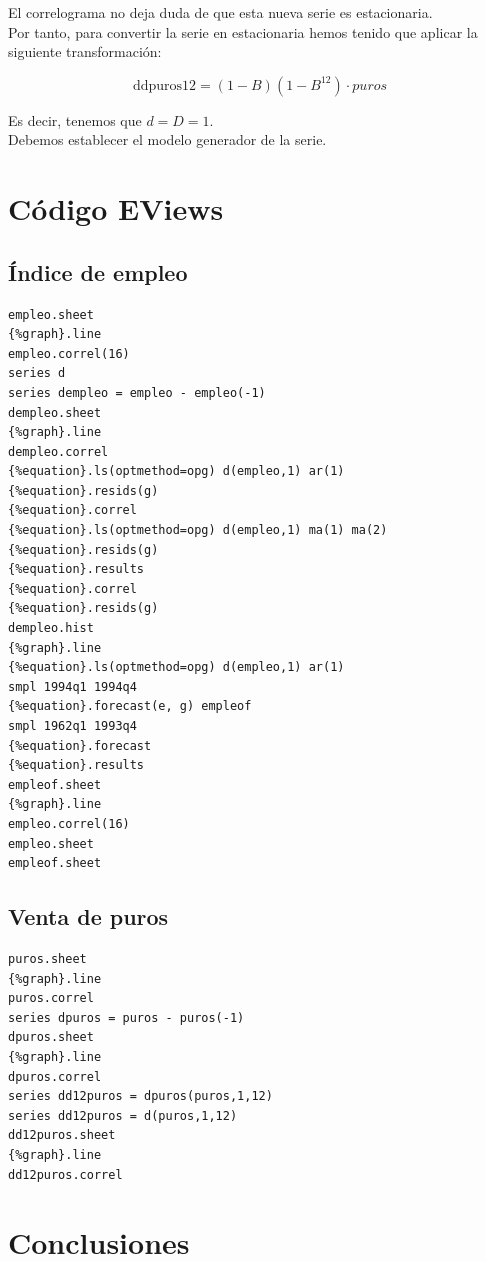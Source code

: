 \documentclass[12pt,a4paper,twoside,openright,titlepage,final]{article}
\begin{document}
El correlograma no deja duda de que esta nueva serie es estacionaria.\\

Por tanto, para convertir la serie en estacionaria hemos tenido que aplicar la siguiente transformación:

\[ \text{ddpuros12} = (1-B)(1-B^{12}) \cdot puros \]

Es decir, tenemos que $d=D=1$.\\

Debemos establecer el modelo generador de la serie.

\section{Código EViews}

\subsection{Índice de empleo}

\begin{verbatim}
empleo.sheet
{%graph}.line
empleo.correl(16)
series d
series dempleo = empleo - empleo(-1)
dempleo.sheet
{%graph}.line
dempleo.correl
{%equation}.ls(optmethod=opg) d(empleo,1) ar(1)
{%equation}.resids(g)
{%equation}.correl
{%equation}.ls(optmethod=opg) d(empleo,1) ma(1) ma(2)
{%equation}.resids(g)
{%equation}.results
{%equation}.correl
{%equation}.resids(g)
dempleo.hist
{%graph}.line
{%equation}.ls(optmethod=opg) d(empleo,1) ar(1)
smpl 1994q1 1994q4
{%equation}.forecast(e, g) empleof
smpl 1962q1 1993q4
{%equation}.forecast 
{%equation}.results
empleof.sheet
{%graph}.line
empleo.correl(16)
empleo.sheet
empleof.sheet
\end{verbatim}

\subsection{Venta de puros}


\begin{verbatim}
puros.sheet
{%graph}.line
puros.correl
series dpuros = puros - puros(-1)
dpuros.sheet
{%graph}.line
dpuros.correl
series dd12puros = dpuros(puros,1,12)
series dd12puros = d(puros,1,12)
dd12puros.sheet
{%graph}.line
dd12puros.correl
\end{verbatim}


\section{Conclusiones}
\end{document}
